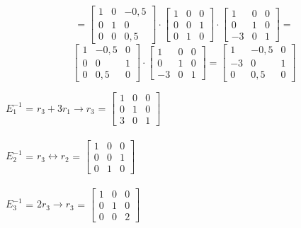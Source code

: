 \documentclass[12pt]{article}
\begin{document}
{$$=
\begin{bmatrix}
1 & 0 & -0,5\\
0 & 1 & 0\\
0 & 0 & 0,5
\end{bmatrix}
\cdot
\begin{bmatrix}
1 & 0 & 0 \\
0 & 0 & 1 \\
0 & 1 & 0
\end{bmatrix}
\cdot
\begin{bmatrix}
1 & 0 & 0 \\
0 & 1 & 0 \\
-3 & 0 & 1
\end{bmatrix}
=$$
$$
\begin{bmatrix}
1 & -0,5 & 0 \\
0 & 0 & 1 \\
0 & 0,5 & 0
\end{bmatrix}
\cdot
\begin{bmatrix}
1 & 0 & 0 \\
0 & 1 & 0 \\
-3 & 0 & 1
\end{bmatrix} =
\begin{bmatrix}
1 & -0,5 & 0 \\
-3 & 0 & 1 \\
0 & 0,5 & 0
\end{bmatrix}
$$

\textbf{$E_1^{-1}$} = $r_3 + 3r_1 \rightarrow r_3$ = 
$\begin{bmatrix}
1 & 0 & 0 \\
0 & 1 & 0 \\
3 & 0 & 1
\end{bmatrix}$\\\\


\textbf{$E_2^{-1}$} = $r_3 \leftrightarrow r_2 $ = 
$\begin{bmatrix}
1 & 0 & 0 \\
0 & 0 & 1 \\
0 & 1 & 0
\end{bmatrix}$\\\\


\textbf{$E_3^{-1}$} = $2r_3 \rightarrow r_3 $ = 
$\begin{bmatrix}
1 & 0 & 0 \\
0 & 1 & 0 \\
0 & 0 & 2
\end{bmatrix}$\\\\


}
\end{document}

